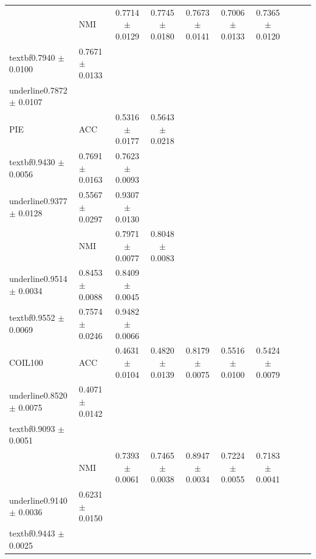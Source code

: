 \begin{table}[t]
{\begin{tabular}{llcccccccc}
 & NMI & 0.7714 $\pm$ 0.0129 & 0.7745 $\pm$ 0.0180 & 0.7673 $\pm$ 0.0141 & 0.7006 $\pm$ 0.0133 & 0.7365 $\pm$ 0.0120 & \\textbf{0.7940 $\pm$ 0.0100} & 0.7671 $\pm$ 0.0133 & \\underline{0.7872 $\pm$ 0.0107} \\
PIE & ACC & 0.5316 $\pm$ 0.0177 & 0.5643 $\pm$ 0.0218 & \\textbf{0.9430 $\pm$ 0.0056} & 0.7691 $\pm$ 0.0163 & 0.7623 $\pm$ 0.0093 & \\underline{0.9377 $\pm$ 0.0128} & 0.5567 $\pm$ 0.0297 & 0.9307 $\pm$ 0.0130 \\
 & NMI & 0.7971 $\pm$ 0.0077 & 0.8048 $\pm$ 0.0083 & \\underline{0.9514 $\pm$ 0.0034} & 0.8453 $\pm$ 0.0088 & 0.8409 $\pm$ 0.0045 & \\textbf{0.9552 $\pm$ 0.0069} & 0.7574 $\pm$ 0.0246 & 0.9482 $\pm$ 0.0066 \\
COIL100 & ACC & 0.4631 $\pm$ 0.0104 & 0.4820 $\pm$ 0.0139 & 0.8179 $\pm$ 0.0075 & 0.5516 $\pm$ 0.0100 & 0.5424 $\pm$ 0.0079 & \\underline{0.8520 $\pm$ 0.0075} & 0.4071 $\pm$ 0.0142 & \\textbf{0.9093 $\pm$ 0.0051} \\
 & NMI & 0.7393 $\pm$ 0.0061 & 0.7465 $\pm$ 0.0038 & 0.8947 $\pm$ 0.0034 & 0.7224 $\pm$ 0.0055 & 0.7183 $\pm$ 0.0041 & \\underline{0.9140 $\pm$ 0.0036} & 0.6231 $\pm$ 0.0150 & \\textbf{0.9443 $\pm$ 0.0025} \\
\bottomrule
\end{tabular}
}
\end{table}
